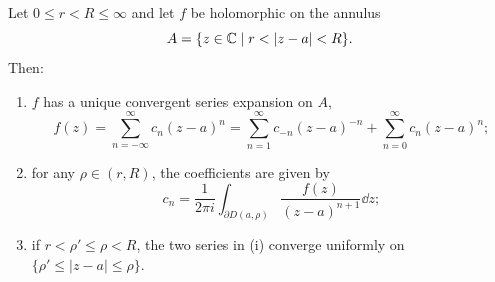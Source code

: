 \documentclass[a4paper]{scrartcl}
\begin{document}
\begin{theorem}
    Let $0 \leq r < R \leq \infty$ and let $f$ be holomorphic on the annulus
    $$
    A = \{z \in \mathbb{C} \mid r < |z - a| < R\}.
    $$
    Then:
    \begin{enumerate}[label=(\roman*)]
        \item $f$ has a unique convergent series expansion on $A$,
        $$
        f(z) = \sum_{n = -\infty}^{\infty} c_n (z - a)^n = \sum_{n = 1}^{\infty} c_{-n}(z - a)^{-n} + \sum_{n = 0}^{\infty} c_n (z - a)^n;
        $$
        \item for any $\rho \in (r, R)$, the coefficients are given by
        $$
        c_n = \frac{1}{2 \pi i}\int_{\partial D(a, \rho)} \frac{f(z)}{(z - a)^{n + 1}} \dd z;
        $$
        \item if $r < \rho' \leq \rho < R$, the two series in (i) converge uniformly on $\{\rho' \leq |z - a| \leq \rho\}$.
    \end{enumerate}
\end{theorem}
\end{document}
